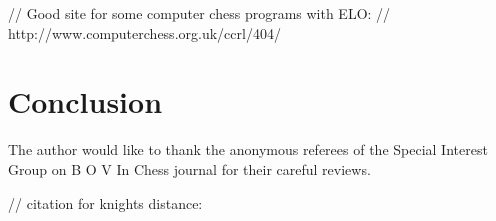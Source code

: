 \documentclass[10pt,preprint,twocolumn]{acmart}
\begin{document}


// Good site for some computer chess programs with ELO:
// http://www.computerchess.org.uk/ccrl/404/

\section{Conclusion}

The author would like to thank the anonymous referees
of the Special Interest Group on
B
O
V
In
Chess journal for their careful reviews.

\nocite{elo1978rating}
\nocite{topple}
// citation for knights distance:
\nocite{miller2013counting}

% 


\end{document}
